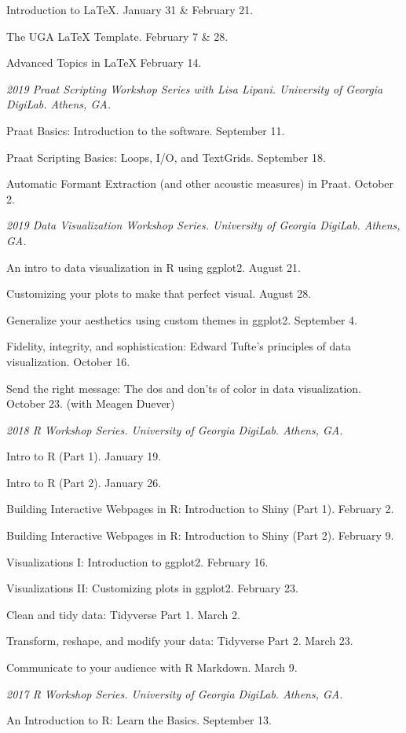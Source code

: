 \documentclass[
]{article}
\begin{document}
Introduction to LaTeX. January 31 \& February 21.

The UGA LaTeX Template. February 7 \& 28.

Advanced Topics in LaTeX February 14.

\emph{2019 Praat Scripting Workshop Series with Lisa Lipani. University
of Georgia DigiLab. Athens, GA.}

Praat Basics: Introduction to the software. September 11.

Praat Scripting Basics: Loops, I/O, and TextGrids. September 18.

Automatic Formant Extraction (and other acoustic measures) in Praat.
October 2.

\emph{2019 Data Visualization Workshop Series. University of Georgia
DigiLab. Athens, GA.}

An intro to data visualization in R using ggplot2. August 21.

Customizing your plots to make that perfect visual. August 28.

Generalize your aesthetics using custom themes in ggplot2. September 4.

Fidelity, integrity, and sophistication: Edward Tufte's principles of
data visualization. October 16.

Send the right message: The dos and don'ts of color in data
visualization. October 23. (with Meagen Duever)

\emph{2018 R Workshop Series. University of Georgia DigiLab. Athens,
GA.}

Intro to R (Part 1). January 19.

Intro to R (Part 2). January 26.

Building Interactive Webpages in R: Introduction to Shiny (Part 1).
February 2.

Building Interactive Webpages in R: Introduction to Shiny (Part 2).
February 9.

Visualizations I: Introduction to ggplot2. February 16.

Visualizations II: Customizing plots in ggplot2. February 23.

Clean and tidy data: Tidyverse Part 1. March 2.

Transform, reshape, and modify your data: Tidyverse Part 2. March 23.

Communicate to your audience with R Markdown. March 9.

\emph{2017 R Workshop Series. University of Georgia DigiLab. Athens,
GA.}

An Introduction to R: Learn the Basics. September 13.
\end{document}
